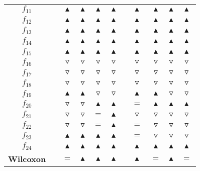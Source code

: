 \begin{tabular}{ccccccccccc}
$f_{11}$ && $\blacktriangle$ & $\blacktriangle$ & $\blacktriangle$ & $\blacktriangle$ &  & $\blacktriangle$ & $\blacktriangle$ & $\blacktriangle$ & $\blacktriangle$ \\
$f_{12}$ && $\blacktriangle$ & $\blacktriangle$ & $\blacktriangle$ & $\blacktriangle$ &  & $\blacktriangle$ & $\blacktriangle$ & $\blacktriangle$ & $\blacktriangle$ \\
$f_{13}$ && $\blacktriangle$ & $\blacktriangle$ & $\blacktriangle$ & $\blacktriangle$ &  & $\blacktriangle$ & $\blacktriangle$ & $\blacktriangle$ & $\blacktriangle$ \\
$f_{14}$ && $\blacktriangle$ & $\blacktriangle$ & $\blacktriangle$ & $\blacktriangle$ &  & $\blacktriangle$ & $\blacktriangle$ & $\blacktriangle$ & $\blacktriangle$ \\
\midrule
$f_{15}$ && $\blacktriangle$ & $\blacktriangle$ & $\blacktriangle$ & $\blacktriangle$ &  & $\blacktriangle$ & $\blacktriangle$ & $\blacktriangle$ & $\blacktriangle$ \\
$f_{16}$ && $\triangledown$ & $\triangledown$ & $\triangledown$ & $\triangledown$ &  & $\triangledown$ & $\triangledown$ & $\triangledown$ & $\triangledown$ \\
$f_{17}$ && $\triangledown$ & $\triangledown$ & $\triangledown$ & $\triangledown$ &  & $\triangledown$ & $\triangledown$ & $\triangledown$ & $\triangledown$ \\
$f_{18}$ && $\triangledown$ & $\triangledown$ & $\triangledown$ & $\triangledown$ &  & $\triangledown$ & $\triangledown$ & $\triangledown$ & $\triangledown$ \\
$f_{19}$ && $\blacktriangle$ & $\blacktriangle$ & $\triangledown$ & $\triangledown$ &  & $\blacktriangle$ & $\blacktriangle$ & $\triangledown$ & $\triangledown$ \\
\midrule
$f_{20}$ && $\triangledown$ & $\triangledown$ & $\blacktriangle$ & $\blacktriangle$ &  & $=$ & $\blacktriangle$ & $\blacktriangle$ & $\blacktriangle$ \\
$f_{21}$ && $\triangledown$ & $\triangledown$ & $=$ & $\blacktriangle$ &  & $\triangledown$ & $\triangledown$ & $\triangledown$ & $\triangledown$ \\
$f_{22}$ && $\triangledown$ & $\triangledown$ & $=$ & $\blacktriangle$ &  & $=$ & $\triangledown$ & $\triangledown$ & $\triangledown$ \\
$f_{23}$ && $\blacktriangle$ & $\blacktriangle$ & $\blacktriangle$ & $\blacktriangle$ &  & $=$ & $\triangledown$ & $\triangledown$ & $\triangledown$ \\
$f_{24}$ && $\blacktriangle$ & $\blacktriangle$ & $\blacktriangle$ & $\blacktriangle$ &  & $\blacktriangle$ & $\blacktriangle$ & $\blacktriangle$ & $\blacktriangle$ \\
\midrule
\midrule
\textbf{Wilcoxon} && $=$ & $\blacktriangle$ & $\blacktriangle$ & $\blacktriangle$ &  & $\blacktriangle$ & $=$ & $\blacktriangle$ & $=$ \\
\bottomrule
\end{tabular}
